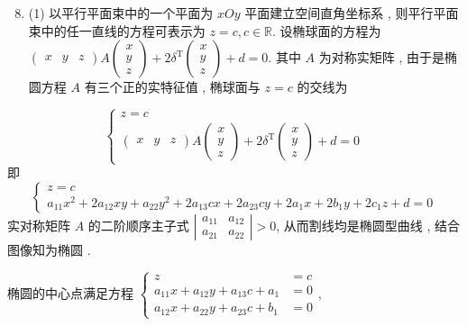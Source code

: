 \documentclass[10pt]{article}
\begin{document}
\begin{enumerate}
  \setcounter{enumi}{7}
  \item (1)  以平行平面束中的一个平面为  $x O y$  平面建立空间直角坐标系 ,  则平行平面束中的任一直线的方程可表示为  $z=c, c \in \mathbb{R}$.  设椭球面的方程为  $\left(\begin{array}{lll}x & y & z\end{array}\right) A\left(\begin{array}{l}x \\ y \\ z\end{array}\right)+2 \delta^{\mathrm{T}}\left(\begin{array}{l}x \\ y \\ z\end{array}\right)+d=0$.  其中  $A$  为对称实矩阵 ,  由于是椭圆方程  $A$  有三个正的实特征值 ,  椭球面与  $z=c$  的交线为 
\end{enumerate}
$$
\left\{\begin{array}{c}
z=c \\
\left(\begin{array}{lll}
x & y & z
\end{array}\right) A\left(\begin{array}{l}
x \\
y \\
z
\end{array}\right)+2 \delta^{\mathrm{T}}\left(\begin{array}{l}
x \\
y \\
z
\end{array}\right)+d=0
\end{array}\right.
$$
 即 
$$
\left\{\begin{array}{r}
z=c \\
a_{11} x^{2}+2 a_{12} x y+a_{22} y^{2}+2 a_{13} c x+2 a_{23} c y+2 a_{1} x+2 b_{1} y+2 c_{1} z+d=0
\end{array}\right.
$$
 实对称矩阵  $A$  的二阶顺序主子式  $\left|\begin{array}{ll}a_{11} & a_{12} \\ a_{21} & a_{22}\end{array}\right|>0$,  从而割线均是椭圆型曲线 ,  结合图像知为椭圆 .

 椭圆的中心点满足方程  $\left\{\begin{aligned} z &=c \\ a_{11} x+a_{12} y+a_{13} c+a_{1} &=0 \\ a_{12} x+a_{22} y+a_{23} c+b_{1} &=0 \end{aligned}\right.$,
\end{document}
